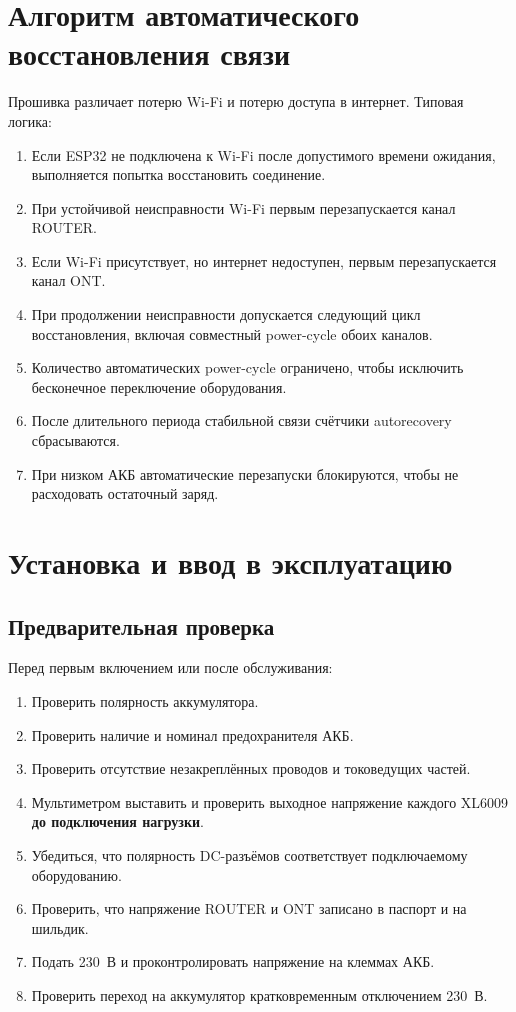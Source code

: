 \documentclass[11pt,a4paper]{article}
\begin{document}
\section{Алгоритм автоматического восстановления связи}

Прошивка различает потерю Wi-Fi и потерю доступа в интернет. Типовая логика:
\begin{enumerate}[leftmargin=8mm]
  \item Если ESP32 не подключена к Wi-Fi после допустимого времени ожидания, выполняется попытка восстановить соединение.
  \item При устойчивой неисправности Wi-Fi первым перезапускается канал ROUTER.
  \item Если Wi-Fi присутствует, но интернет недоступен, первым перезапускается канал ONT.
  \item При продолжении неисправности допускается следующий цикл восстановления, включая совместный power-cycle обоих каналов.
  \item Количество автоматических power-cycle ограничено, чтобы исключить бесконечное переключение оборудования.
  \item После длительного периода стабильной связи счётчики autorecovery сбрасываются.
  \item При низком АКБ автоматические перезапуски блокируются, чтобы не расходовать остаточный заряд.
\end{enumerate}

\section{Установка и ввод в эксплуатацию}

\subsection{Предварительная проверка}
Перед первым включением или после обслуживания:
\begin{enumerate}[leftmargin=8mm]
  \item Проверить полярность аккумулятора.
  \item Проверить наличие и номинал предохранителя АКБ.
  \item Проверить отсутствие незакреплённых проводов и токоведущих частей.
  \item Мультиметром выставить и проверить выходное напряжение каждого XL6009 \textbf{до подключения нагрузки}.
  \item Убедиться, что полярность DC-разъёмов соответствует подключаемому оборудованию.
  \item Проверить, что напряжение ROUTER и ONT записано в паспорт и на шильдик.
  \item Подать 230~В и проконтролировать напряжение на клеммах АКБ.
  \item Проверить переход на аккумулятор кратковременным отключением 230~В.
\end{enumerate}
\end{document}
